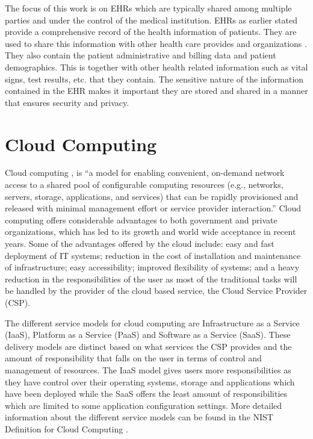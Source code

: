 The focus of this work is on EHRs which are typically shared among multiple parties and under the control of the medical institution. EHRs as earlier stated provide a comprehensive record of the health information of patients. They are used to share this information with other health care provides and organizations \cite{ehrhealthitmain, ehrhealthit}. They also contain the patient administrative and billing data and patient demographics. This is together with other health related information such as vital signs, test results, etc.  that they contain. The sensitive nature of the information contained in the EHR makes it important they are stored and shared in a manner that ensures security and privacy.

\section{Cloud Computing}

Cloud computing \cite{nist}, is ``a model for enabling convenient, on-demand network access to a shared pool of configurable computing resources (e.g., networks, servers, storage, applications, and services) that can be rapidly provisioned and released with minimal management effort or service provider interaction.'' Cloud computing offers considerable advantages to both government and private organizations, which has led to its growth and world wide acceptance in recent years. Some of the advantages offered by the cloud include: easy and fast deployment of IT systems; reduction in the cost of installation and maintenance of infrastructure; easy accessibility; improved flexibility of systems; and a heavy reduction in the responsibilities of the user as most of the traditional tasks will be handled by the provider of the cloud based service, the Cloud Service Provider (CSP).

The different service models for cloud computing are Infrastructure as a Service (IaaS), Platform as a Service (PaaS) and Software as a Service (SaaS). These delivery models are distinct based on what services the CSP provides and the amount of responsibility that falls on the user in terms of control and management of resources. The IaaS model gives users more responsibilities as they have control over their operating systems, storage and applications which have been deployed while the SaaS offers the least amount of responsibilities which are limited to some application configuration settings. More detailed information about the different service models can be found in the NIST Definition for Cloud Computing \cite{nist}.

